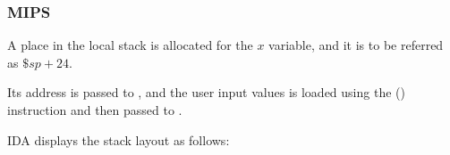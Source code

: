 \subsubsection{MIPS}

A place in the local stack is allocated for the $x$ variable, and it is to be referred as $\$sp+24$.

Its address is passed to \scanf, and the user input values is loaded using the  () instruction
and then passed to \printf.



IDA displays the stack layout as follows:



